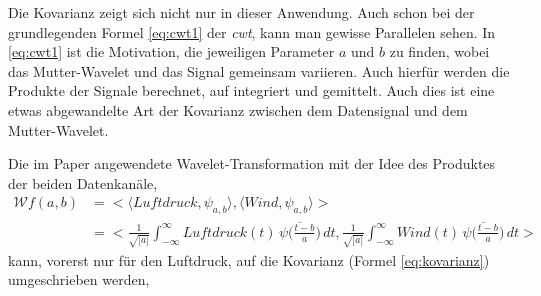\begin{refsection}
Die Kovarianz zeigt sich nicht nur in dieser Anwendung. Auch schon bei der grundlegenden Formel \ref{eq:cwt1} der \textit{cwt}, kann man gewisse Parallelen sehen. 
In \ref{eq:cwt1} ist die Motivation, die jeweiligen Parameter $a$ und $b$ zu finden, wobei das Mutter-Wavelet und das Signal gemeinsam variieren.
Auch hierfür werden die Produkte der Signale berechnet, auf integriert und gemittelt.
Auch dies ist eine etwas abgewandelte Art der Kovarianz zwischen dem Datensignal und dem Mutter-Wavelet.


Die im Paper angewendete Wavelet-Transformation mit der Idee des Produktes der beiden Datenkanäle,
\begin{equation}
\begin{split}
\mathcal{W}f (a,b)
& =
\biggl<\langle Luftdruck,\psi_{a,b}\rangle, \langle Wind,\psi_{a,b} \rangle \biggr > \\
& = \biggl< \frac{1}{\sqrt{|a|}}\int_{-\infty}^\infty Luftdruck(t)\,\overline{
	\psi\biggl(\frac{t-b}{a}\biggr)}\,dt
,
\frac{1}{\sqrt{|a|}}\int_{-\infty}^\infty Wind(t)\,\overline{
	\psi\biggl(\frac{t-b}{a}\biggr)}\,dt \biggr>
\label{eq:cwt_wwt}
\end{split}
\end{equation}
kann, vorerst nur für den Luftdruck, auf die Kovarianz (Formel \ref{eq:kovarianz}) umgeschrieben werden,


\end{refsection}

